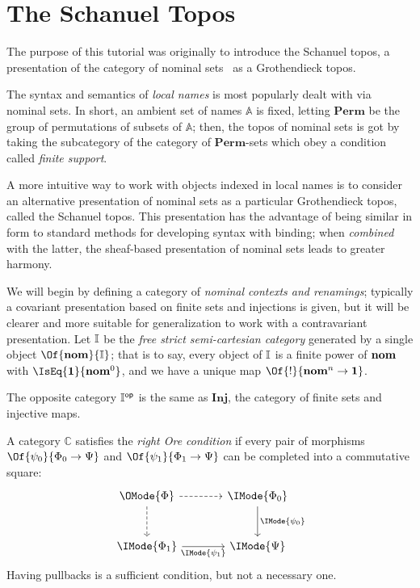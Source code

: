 \documentclass{article}
\newcommand\OpCat[1]{{{#1}^{\mathsf{op}}}}
\newcommand\One{\mathbf{1}}
\begin{document}
\section{The Schanuel Topos}

The purpose of this tutorial was originally to introduce the Schanuel topos, a
presentation of the category of nominal sets~\cite{pitts:2013} as a
Grothendieck topos.

The syntax and semantics of \emph{local names} is most popularly dealt
with via nominal sets. In short, an ambient set of names $\mathbb{A}$
is fixed, letting $\mathbf{Perm}$ be the group of permutations of
subsets of $\mathbb{A}$; then, the topos of nominal sets is got by
taking the subcategory of the category of $\mathbf{Perm}$-sets which
obey a condition called \emph{finite support}.

A more intuitive way to work with objects indexed in local names is to
consider an alternative presentation of nominal sets as a particular
Grothendieck topos, called the Schanuel topos. This presentation has
the advantage of being similar in form to standard methods for
developing syntax with binding; when \emph{combined} with the latter,
the sheaf-based presentation of nominal sets leads to greater harmony.

\begin{definition}
  We will begin by defining a category of \emph{nominal contexts and
    renamings}; typically a covariant presentation based on finite
  sets and injections is given, but it will be clearer and more
  suitable for generalization to work with a contravariant
  presentation. Let $\mathbb{I}$ be the \emph{free strict
    semi-cartesian category} generated by a single object $\Of{\ObjNom}{\CatI}$;
  that is to say, every object of $\mathbb{I}$ is a finite power of
  $\mathbf{nom}$ with $\IsEq{\One}{\ObjNom^0}$, and we have a unique map
  $\Of{!}{\ObjNom^n\to\One}$.
\end{definition}

\begin{remark}
  The opposite category $\OpCat\CatI$ is the same as $\mathbf{Inj}$,
  the category of finite sets and injective maps.
\end{remark}

\begin{definition}\label{def:ore}
  A category $\mathbb{C}$ satisfies the \emph{right Ore condition} if
  every pair of morphisms
  $\Of{\psi_0}{\Phi_0\to\Psi}$ and
  $\Of{\psi_1}{\Phi_1\to\Psi}$ can be completed into
  a commutative square:
  \[
    \begin{tikzcd}[sep=large]
      \OMode{\Phi}
      \arrow[r,dashed]
      \arrow[d,dashed]
      &
      \IMode{\Phi_0}
      \arrow[d,"\IMode{\psi_0}"]
      \\
      \IMode{\Phi_1}
      \arrow[r,swap,"\IMode{\psi_1}"]
      &
      \IMode{\Psi}
    \end{tikzcd}
  \]
  Having pullbacks is a sufficient condition, but not a necessary one.
\end{definition}
\end{document}
